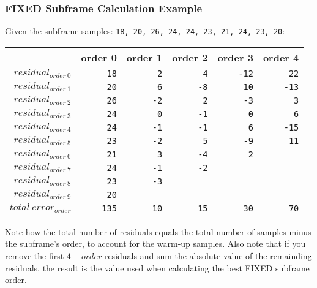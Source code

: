 \clearpage

\subsubsection{FIXED Subframe Calculation Example}

Given the subframe samples: \texttt{18, 20, 26, 24, 24, 23, 21, 24, 23, 20}:
\begin{table}[h]
\begin{tabular}{r|r|r|r|r|r}
& order 0 & order 1 & order 2 & order 3 & order 4 \\
\hline
$residual_{order~0}$ & \texttt{\color{gray}18} & \texttt{\color{gray}2} & \texttt{\color{gray}4} & \texttt{\color{gray}-12} & \texttt{22} \\
$residual_{order~1}$ & \texttt{\color{gray}20} & \texttt{\color{gray}6} & \texttt{\color{gray}-8} & \texttt{10} & \texttt{-13} \\
$residual_{order~2}$ & \texttt{\color{gray}26} & \texttt{\color{gray}-2} & \texttt{2} & \texttt{-3} & \texttt{3} \\
$residual_{order~3}$ & \texttt{\color{gray}24} & \texttt{0} & \texttt{-1} & \texttt{0} & \texttt{6} \\
$residual_{order~4}$ & \texttt{24} & \texttt{-1} & \texttt{-1} & \texttt{6} & \texttt{-15} \\
$residual_{order~5}$ & \texttt{23} & \texttt{-2} & \texttt{5} & \texttt{-9} & \texttt{11} \\
$residual_{order~6}$ & \texttt{21} & \texttt{3} & \texttt{-4} & \texttt{2} \\
$residual_{order~7}$ & \texttt{24} & \texttt{-1} & \texttt{-2} \\
$residual_{order~8}$ & \texttt{23} & \texttt{-3} \\
$residual_{order~9}$ & \texttt{20} \\
\hline
$total~error_{order}$ & \texttt{135} & \texttt{10} & \texttt{15} & \texttt{30} & \texttt{70} \\
\end{tabular}
\end{table}
\par
\noindent
Note how the total number of residuals equals the
total number of samples minus the subframe's order,
to account for the warm-up samples.
Also note that if you remove the first $4 - order$ residuals
and sum the absolute value of the remainding residuals,
the result is the  value
used when calculating the best FIXED subframe order.


